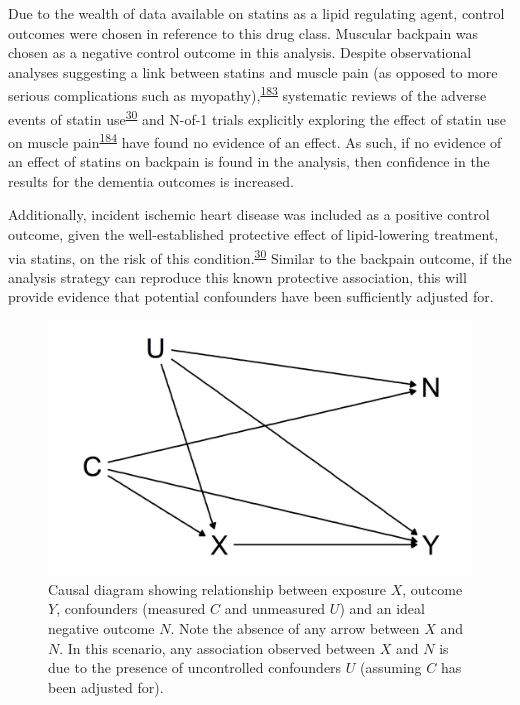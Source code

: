 \documentclass[a4paper, twoside]{templates/ociamthesis}
\begin{document}
Due to the wealth of data available on statins as a lipid regulating agent, control outcomes were chosen in reference to this drug class. Muscular backpain was chosen as a negative control outcome in this analysis. Despite observational analyses suggesting a link between statins and muscle pain (as opposed to more serious complications such as myopathy),\textsuperscript{\protect\hyperlink{ref-selva-ocallaghan2018}{183}} systematic reviews of the adverse events of statin use\textsuperscript{\protect\hyperlink{ref-collins2016a}{30}} and N-of-1 trials explicitly exploring the effect of statin use on muscle pain\textsuperscript{\protect\hyperlink{ref-herrett2021}{184}} have found no evidence of an effect. As such, if no evidence of an effect of statins on backpain is found in the analysis, then confidence in the results for the dementia outcomes is increased.

Additionally, incident ischemic heart disease was included as a positive control outcome, given the well-established protective effect of lipid-lowering treatment, via statins, on the risk of this condition.\textsuperscript{\protect\hyperlink{ref-collins2016a}{30}} Similar to the backpain outcome, if the analysis strategy can reproduce this known protective association, this will provide evidence that potential confounders have been sufficiently adjusted for.





\begin{figure}[H]
\includegraphics[width=1\linewidth]{figures/cprd-analysis/negativeOutcome} \caption[DAG of ideal negative outcome]{Causal diagram showing relationship between exposure \(X\), outcome \(Y\), confounders (measured \(C\) and unmeasured \(U\)) and an ideal negative outcome \(N\). Note the absence of any arrow between \(X\) and \(N\). In this scenario, any association observed between \(X\) and \(N\) is due to the presence of uncontrolled confounders \(U\) (assuming \(C\) has been adjusted for).}\label{fig:negativeOutcome}
\end{figure}
\end{document}
